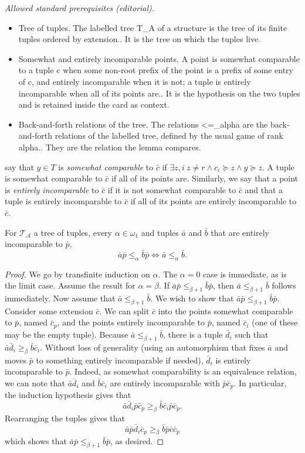 \documentclass[10pt,a4paper]{amsart}
\providecommand{\A}{\mathcal{A}}
\providecommand{\bp}{\bar p}
\providecommand{\ba}{\bar a}
\providecommand{\bb}{\bar b}
\providecommand{\bc}{\bar c}
\providecommand{\bd}{\bar d}
\newcommand{\T}{{\mathcal{T}}}
\begin{document}
\noindent\textit{Allowed standard prerequisites (editorial).}\begin{itemize}
\item Tree of tuples. The labelled tree T\_A of a structure is the tree of its finite tuples ordered by extension.. It is the tree on which the tuples live.
\item Somewhat and entirely incomparable points. A point is somewhat comparable to a tuple c when some non-root prefix of the point is a prefix of some entry of c, and entirely incomparable when it is not; a tuple is entirely incomparable when all of its points are.. It is the hypothesis on the two tuples and is retained inside the card as context.
\item Back-and-forth relations of the tree. The relations <=\_alpha are the back-and-forth relations of the labelled tree, defined by the usual game of rank alpha.. They are the relation the lemma compares.
\end{itemize}\medskip
say that $y\in T$ is \textit{somewhat comparable} to $\bar{c}$ if $\exists z,i ~
z\neq r\land c_i\succeq z \land y\succeq z$.
A tuple is somewhat comparable to $\bar{c}$ if all of its points are.
Similarly, we say that a point is \textit{entirely incomparable} to $\bar{c}$ if it is not somewhat comparable to $\bar{c}$ and that a tuple is entirely incomparable to $\bar{c}$ if all of its points are entirely incomparable to $\bar{c}$.


\begin{lemma}\label{lem:bftos_noparameters}
For $\T_\A$ a tree of tuples, every $\alpha\in\omega_1$ and tuples $\ba$ and $\bb$ that are entirely incomparable to $\bp$,
\[\ba\bp\leq_\alpha\bb\bp \iff \ba\leq_\alpha\bb.\]
\end{lemma}

\begin{proof}
We go by transfinite induction on $\alpha$.
The $\alpha=0$ case is immediate, as is the limit case.
Assume the result for $\alpha=\beta$.
If $\ba\bp\leq_{\beta+1}\bb\bp$, then $\ba\leq_{\beta+1}\bb$ follows immediately.
Now assume that $\ba\leq_{\beta+1}\bb$.
We wish to show that $\ba\bp\leq_{\beta+1}\bb\bp$.
Consider some extension $\bc$.
We can split $\bc$ into the points somewhat comparable to $\bp$, named $\bc_p$, and the points entirely incomparable to $\bp$, named $\bc_i$ (one of these may be the empty tuple).
Because $\ba\leq_{\beta+1}\bb$, there is a tuple $\bd_i$ such that $\ba\bd_i\geq_{\beta}\bb\bc_i$.
Without loss of generality (using an automorphism that fixes $\ba$ and moves $\bp$ to something entirely incomparable if needed), $\bd_i$ is entirely incomparable to $\bp$. 
Indeed, as somewhat comparability is an equivalence relation, we can note that $\ba\bd_i$ and $\bb\bc_i$ are entirely incomparable with $\bp\bc_p$.
In particular, the induction hypothesis gives that
\[\ba\bd_i\bp\bc_p\geq_{\beta}\bb\bc_i\bp\bc_p.\]
Rearranging the tuples gives that
\[\ba\bp\bd_i\bc_p\geq_{\beta}\bb\bp\bc\bc_p\]
which shows that $\ba\bp\leq_{\beta+1}\bb\bp$, as desired.
\end{proof}
\end{document}
